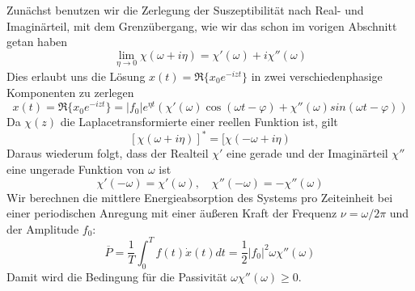 Zunächst benutzen wir die Zerlegung der Suszeptibilität nach Real- und
Imaginärteil, mit dem Grenzübergang, wie wir das schon im vorigen Abschnitt
getan haben
\[ 
\lim_{\eta\rightarrow 0}\chi(\omega+i\eta)=\chi'(\omega)+i\chi''(\omega)
\]
Dies erlaubt uns die Lösung $x(t)=\Re\{x_0e^{-izt}\}$ in zwei
verschiedenphasige Komponenten zu zerlegen
\begin{equation}
  x(t)=\Re\{x_0e^{-izt}\}=
  |f_0|e^{\eta t}\left(\chi'(\omega)\cos(\omega t-\varphi)
  +\chi''(\omega)sin(\omega t-\varphi)\right)
  \label{eq:Zweiphasig}
\end{equation}
Da $\chi(z)$ die Laplacetransformierte einer reellen Funktion ist, gilt
\[ [\chi(\omega+i\eta)]^*=[\chi(-\omega+i\eta)\]
Daraus wiederum folgt, dass der Realteil $\chi'$ eine gerade und der
Imaginärteil $\chi''$ eine ungerade Funktion von $\omega$ ist
\[ \chi'(-\omega)=\chi'(\omega),\quad \chi''(-\omega)=-\chi''(\omega) \]
Wir berechnen die mittlere Energieabsorption des Systems pro Zeiteinheit bei
einer periodischen Anregung mit einer äußeren Kraft der Frequenz
$\nu=\omega/2\pi$ und der Amplitude $f_0$:
\[
  \overline{P}=\frac{1}{T}\int_0^T f(t)\dot{x}(t)dt=
  \frac{1}{2}|f_0|^2\omega\chi''(\omega)
\]
Damit wird die Bedingung für die Passivität $\omega\chi''(\omega)\ge 0$.
%
%
